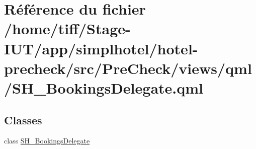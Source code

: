 \hypertarget{SH__BookingsDelegate_8qml}{\section{Référence du fichier /home/tiff/\-Stage-\/\-I\-U\-T/app/simplhotel/hotel-\/precheck/src/\-Pre\-Check/views/qml/\-S\-H\-\_\-\-Bookings\-Delegate.qml}
\label{SH__BookingsDelegate_8qml}
}
\subsection*{Classes}
\begin{DoxyCompactItemize}
\item 
class \hyperlink{classSH__BookingsDelegate}{S\-H\-\_\-\-Bookings\-Delegate}
\end{DoxyCompactItemize}
